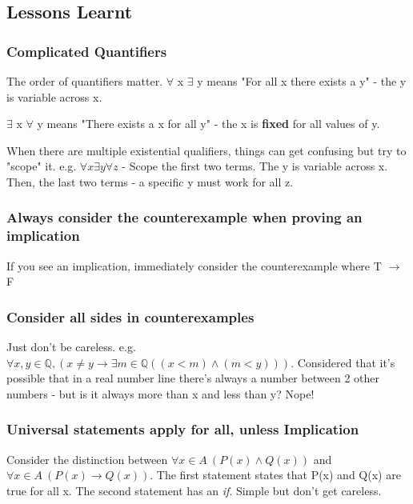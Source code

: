 \documentclass{article}
\begin{document}
\subsection{Lessons Learnt}
\subsubsection{Complicated Quantifiers}
The order of quantifiers matter. $\forall$ x $\exists$ y means "For all x there exists a y" - the y is variable across x.

$\exists$ x $\forall$ y means "There exists a x for all y" - the x is \textbf{fixed} for all values of y.

\vspace{10pt}

When there are multiple existential qualifiers, things can get confusing but try to "scope" it.
e.g. \begin{math}
    \forall x \exists y \forall z
\end{math} - Scope the first two terms. The y is variable across x. Then, the last two terms - a specific y must work for all z.
\subsubsection{Always consider the counterexample when proving an implication}
If you see an implication, immediately consider the counterexample where T $\rightarrow$ F

\subsubsection{Consider all sides in counterexamples}
Just don't be careless. e.g. $\forall x, y \in \mathbb{Q}, (x\neq y \rightarrow \exists m \in \mathbb{Q}((x<m)\wedge(m<y)))$. Considered that it's possible that in a real number line there's always a number between 2 other numbers - but is it always more than x and less than y? Nope!

\subsubsection{Universal statements apply for all, unless Implication}
Consider the distinction between $\forall x \in A\ ({P(x) \wedge Q(x)})$ and $\forall x \in A\ ({P(x) \rightarrow Q(x)})$. The first statement states that P(x) and Q(x) are true for all x. The second statement has an \textit{if}. Simple but don't get careless.

\end{document}
